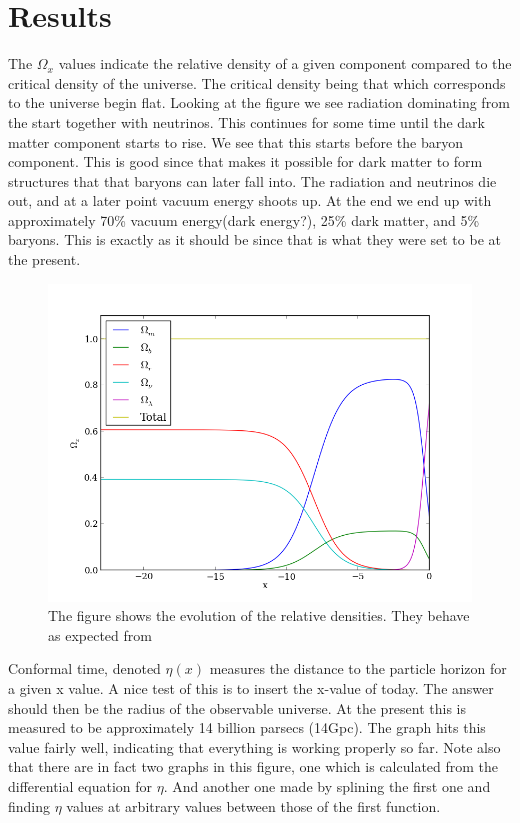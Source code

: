 \documentclass{aa}   %
\begin{document}
\section{Results}\label{sec:simulate_analytic}
 The $\Omega_x$ values indicate the relative density of a given component compared to the critical density of the universe. 
 The critical density being that which corresponds to the universe begin flat.
 Looking at the figure we see radiation dominating from the start together with neutrinos.
 This continues for some time until the dark matter component starts to rise.
 We see that this starts before the baryon component. This is good since that makes it possible for dark matter to form structures that that baryons can later fall into. The radiation and neutrinos die out, and at a later point vacuum energy shoots up. At the end we end up with approximately 70\% vacuum energy(dark energy?), 25\% dark matter, and 5\% baryons. This is exactly as it should be since that is what they were set to be at the present.
 \begin{figure}[ht]
  \includegraphics[width=.49\textwidth]{figure_0.png}
  \caption{The figure shows the evolution of the relative densities. They behave as expected from}
 \label{figure0}
 \end{figure}
 
 Conformal time, denoted $\eta(x)$ measures the distance to the particle horizon for a given x value. A nice test of this is to insert the x-value of today.
 The answer should then be the radius of the observable universe. At the present this is measured to be approximately 14 billion parsecs (14Gpc). 
 The graph hits this value fairly well, indicating that everything is working properly so far. 
 Note also that there are in fact two graphs in this figure, one which is calculated from the differential equation for $\eta$. 
 And another one made by splining the first one and finding $\eta$ values at arbitrary values between those of the first function.
 
\end{document}
